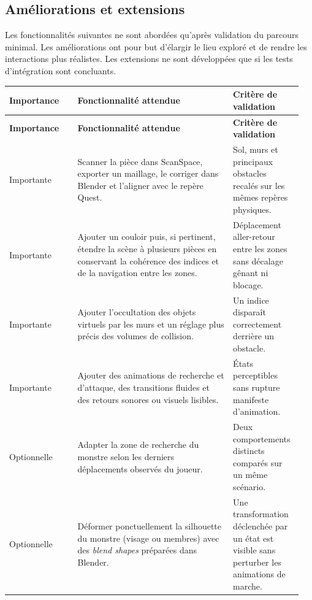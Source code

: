 \documentclass[11pt,a4paper]{article}
\newcommand{\important}{\textcolor{priorityMedium}{Importante}}
\newcommand{\optional}{\textcolor{priorityLow}{Optionnelle}}
\renewcommand{\arraystretch}{1.36}
\begin{document}
\subsection{Améliorations et extensions}

Les fonctionnalités suivantes ne sont abordées qu'après validation du parcours minimal. Les améliorations ont pour but d'élargir le lieu exploré et de rendre les interactions plus réalistes. Les extensions ne sont développées que si les tests d'intégration sont concluants.

{\small
\setlength{\LTpre}{1.1em}
\setlength{\LTpost}{0.9em}
\renewcommand{\arraystretch}{1.44}
\begin{longtable}{@{}L{0.222\linewidth}L{0.50\linewidth}L{0.224\linewidth}@{}}
\toprule
\textbf{Importance} & \textbf{Fonctionnalité attendue} & \textbf{Critère de validation} \\
\midrule
\endfirsthead
\toprule
\textbf{Importance} & \textbf{Fonctionnalité attendue} & \textbf{Critère de validation} \\
\midrule
\endhead
\important & Scanner la pièce dans ScanSpace, exporter un maillage, le corriger dans Blender et l'aligner avec le repère Quest. & Sol, murs et principaux obstacles recalés sur les mêmes repères physiques. \\
\addlinespace[0.25em]
\important & Ajouter un couloir puis, si pertinent, étendre la scène à plusieurs pièces en conservant la cohérence des indices et de la navigation entre les zones. & Déplacement aller-retour entre les zones sans décalage gênant ni blocage. \\
\addlinespace[0.25em]
\important & Ajouter l'occultation des objets virtuels par les murs et un réglage plus précis des volumes de collision. & Un indice disparaît correctement derrière un obstacle. \\
\addlinespace[0.25em]
\important & Ajouter des animations de recherche et d'attaque, des transitions fluides et des retours sonores ou visuels lisibles. & États perceptibles sans rupture manifeste d'animation. \\
\midrule
\optional & Adapter la zone de recherche du monstre selon les derniers déplacements observés du joueur. & Deux comportements distincts comparés sur un même scénario. \\
\addlinespace[0.25em]
\optional & Déformer ponctuellement la silhouette du monstre (visage ou membres) avec des \emph{blend shapes} préparées dans Blender. & Une transformation déclenchée par un état est visible sans perturber les animations de marche. \\

\end{longtable}}
\end{document}
